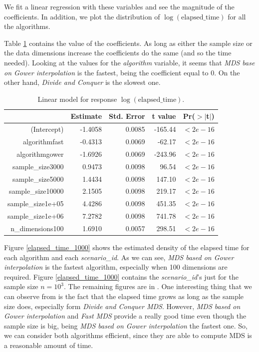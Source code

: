 \documentclass[11pt]{report}
\begin{document}
\indent We fit a linear regression with these
variables and see the magnitude of the coefficients. In addition, we plot the
distribution of $\log(\mbox{elapsed\_time})$ for all the algorithms.

\indent Table \ref{lm_all_variables} contains the value of the coefficients.
As long as either the sample size or the data dimensions increase the 
coefficients do the same (and so the time needed). Looking at the 
values for the \textit{algorithm} variable, it seems that 
\textit{MDS base on Gower interpolation} is the fastest, being the coefficient 
equal to 0. On the other hand, \textit{Divide and Conquer} is the slowest one.

\begin{table}[ht]
\centering
\begin{tabular}{rrrrr}
 & Estimate & Std. Error & t value & Pr($>$$|$t$|$) \\ 
  \hline
(Intercept) & -1.4058 & 0.0085 & -165.44 & $<2e-16$ \\ 
  algorithmfast & -0.4313 & 0.0069 & -62.17 & $<2e-16$ \\ 
  algorithmgower & -1.6926 & 0.0069 & -243.96 & $<2e-16$ \\ 
  sample\_size3000 & 0.9473 & 0.0098 & 96.54 & $<2e-16$ \\ 
  sample\_size5000 & 1.4434 & 0.0098 & 147.10 & $<2e-16$ \\ 
  sample\_size10000 & 2.1505 & 0.0098 & 219.17 & $<2e-16$ \\ 
  sample\_size1e+05 & 4.4286 & 0.0098 & 451.35 & $<2e-16$ \\ 
  sample\_size1e+06 & 7.2782 & 0.0098 & 741.78 & $<2e-16$ \\ 
  n\_dimensions100 & 1.6910 & 0.0057 & 298.51 & $<2e-16$ \\ 
   \hline
\end{tabular}
\caption{Linear model for response $\log(\mbox{elapsed\_time})$.} 
\label{lm_all_variables}
\end{table}

\indent Figure \ref{elapsed_time_1000} shows the estimated density of the
elapsed time for each algorithm and each \textit{scenario\_id}. As we can see, 
\textit{MDS based on Gower interpolation} is the fastest algorithm, especially
when 100 dimensions are required. Figure \ref{elapsed_time_1000} contains the 
\textit{scenario\_id}'s just for the sample size $n = 10^3$. The remaining 
figures are in . One interesting thing that we can
observe from  is the fact that the elapsed time grows
as long as the sample size does, especially form \textit{Divide and Conquer MDS}.
However, \textit{MDS based on Gower interpolation} and \textit{Fast MDS} 
provide a really good time even though the sample size is big, being
\textit{MDS based on Gower interpolation} the fastest one. So, we can consider
both algorithms efficient, since they are able to compute MDS is a reasonable
amount of time.
\end{document}
